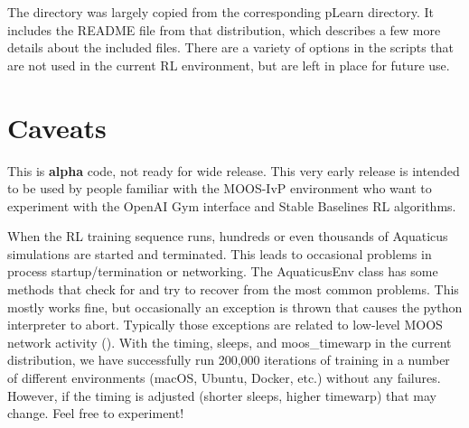 \documentclass[onecolumn,letterpaper,11pt]{article}
\begin{document}
The  directory was largely copied from
the corresponding pLearn  directory. It
includes the README file from that distribution, which describes a few
more details about the included files. There are a variety of options
in the scripts that are not used in the current RL environment, but
are left in place for future use.

\section{Caveats}
This is {\bf alpha} code, not ready for wide release. This very early release
is intended to be used by people familiar with the MOOS-IvP environment who
want to experiment with the OpenAI Gym interface and Stable Baselines RL
algorithms.

When the RL training sequence runs, hundreds or even thousands of
Aquaticus simulations are started and terminated. This leads to
occasional problems in process startup/termination or networking. The
AquaticusEnv class has some methods that check for and try to recover
from the most common problems. This mostly works fine, but
occasionally an exception is thrown that causes the python interpreter
to abort. Typically those exceptions are related to low-level MOOS
network activity (). With the timing, sleeps, and
moos\_timewarp in the current distribution, we have successfully run
200,000 iterations of training in a number of different environments
(macOS, Ubuntu, Docker, etc.)  without any failures. However, if the
timing is adjusted (shorter sleeps, higher timewarp) that may
change. Feel free to experiment!
\end{document}
